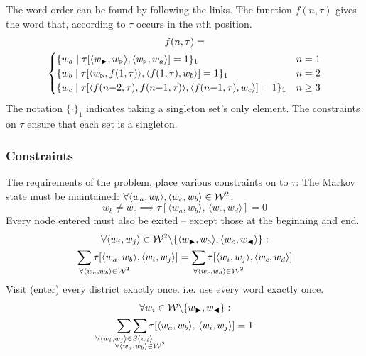 \documentclass[twocolumn]{article}
\begin{document}
The word order can be found by following the links. The function 
$f(n,\tau)$ gives the word that, according to $\tau$ occurs in the $n$th position.
\displayunskip
\begin{multline*}
f(n,\tau)= \\
\begin{cases}
\{w_{a}\mid\tau[\langle w_{\blacktriangleright},w_{\triangleright}\rangle,\langle w_{\triangleright},w_{a}\rangle]=1\}_{1} & n=1\\
\{w_{b}\mid\tau[\langle w_{\triangleright},f(1,\tau)\rangle,\langle f(1,\tau),w_{b}\rangle]=1\}_{1} & n=2\\
\{w_{c}\mid\tau[\langle f(n{-}2,\tau),f(n{-}1,\tau)\rangle,\langle f(n{-}1,\tau),w_{c}\rangle]=1\}_{1} & n\ge3
\end{cases}
\end{multline*}
%
The notation $\{\cdot\}_{1}$ indicates taking a singleton set's only element.
The constraints on $\tau$ ensure that each set is a singleton.




\subsubsection{Constraints}
The requirements of the problem, place various constraints on to $\tau$:
%
The Markov state must be maintained: $\forall\langle w_{a},w_{b}\rangle,\langle w_{c},w_{b}\rangle\in\mathcal{W}^{2}$:
\begin{equation*}
w_{b}\ne w_{c} \implies \tau[\langle w_{a},w_{b}\rangle,\,\langle w_{c},w_{d}\rangle]=0
\end{equation*}
%
Every node entered must also be exited -- except those at the beginning and end.
\begin{multline*}
\forall\langle w_{i},w_{j}\rangle\in\W^{2}\backslash\{\langle\s,\ss\rangle,\langle\e,\ee\rangle\}: \\
 \sum_{\mathrlap{\!\!\!\!\forall\langle w_{a},w_{b}\rangle\in\W^{2}}}\tau[\langle w_{a},w_{b}\rangle,\langle w_{i},w_{j}\rangle]
=\sum_{\mathrlap{\!\!\!\!\forall\langle w_{c},w_{d}\rangle\in\W^{2}}}\tau[\langle w_{i},w_{j}\rangle,\langle w_{c},w_{d}\rangle]
\end{multline*}
%
Visit (enter) every district exactly once. i.e. use every word exactly once.
\displayunskip
\begin{multline*}
\forall w_{i}\in\W\backslash\{\s,\ee\}: \\
\sum_{\mathclap{\forall\langle w_{i},w_{j}\rangle\in S(w_{i}\rangle}}
\sum_{\mathclap{\substack{\; \\ \;\\ \forall\langle w_{a},w_{b}\rangle\in\W^{2}}}}
\tau[\langle w_{a},w_{b}\rangle,\,\langle w_{i},w_{j}\rangle]=1
\end{multline*}
\end{document}
